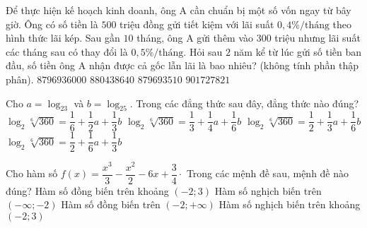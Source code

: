 \begin{ex}%
Để thực hiện kế hoạch kinh doanh, ông A cần chuẩn bị một số vốn ngay từ bây giờ. Ông có số tiền là $500$ triệu đồng gửi tiết kiệm với lãi suất $0{,}4\%/\text{tháng}$ theo hình thức lãi kép. Sau gần $10$ tháng, ông A gửi thêm vào $300$ triệu nhưng lãi suất các tháng sau có thay đổi là $0{,}5\%/\text{tháng}$. Hỏi sau $2$ năm kể từ lúc gửi số tiền ban đầu, số tiền ông A nhận được cả gốc lẫn lãi là bao nhiêu? (không tính phần thập phân).
\choice
{$8796936000$}
{$880438640$}
{\True $879693510$}
{$901727821$}
\end{ex}

\begin{ex}%
Cho $a=\log_23$ và $b=\log_25$. Trong các đẳng thức sau đây, đẳng thức nào đúng?
\choice
{$\log_2\sqrt[6]{360}=\dfrac{1}{6}+\dfrac{1}{2}a+\dfrac{1}{3}b$}
{$\log_2\sqrt[6]{360}=\dfrac{1}{3}+\dfrac{1}{4}a+\dfrac{1}{6}b$}
{\True $\log_2\sqrt[6]{360}=\dfrac{1}{2}+\dfrac{1}{3}a+\dfrac{1}{6}b$}
{$\log_2\sqrt[6]{360}=\dfrac{1}{2}+\dfrac{1}{6}a+\dfrac{1}{3}b$}
\end{ex}

\begin{ex}%
Cho hàm số $f(x)=\dfrac{x^3}{3}-\dfrac{x^2}{2}-6x+\dfrac{3}{4}\cdot$ Trong các mệnh đề sau, mệnh đề nào đúng?
\choice
{Hàm số đồng biến trên khoảng $(-2;3)$}
{Hàm số nghịch biến trên $(-\infty;-2)$}
{Hàm số đồng biến trên $(-2;+\infty)$}
{\True Hàm số nghịch biến trên khoảng $(-2;3)$}
\end{ex}

